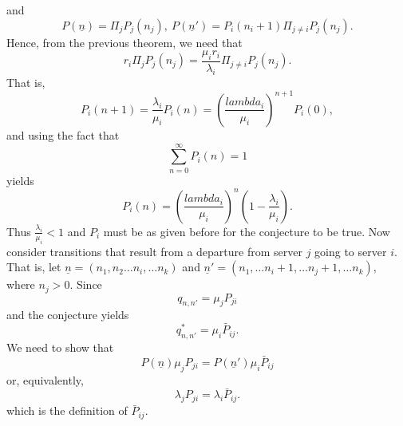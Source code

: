 \documentclass[a4paper,10pt]{article}
\theoremstyle{plain}
\theoremstyle{definition}
\theoremstyle{remark}
\begin{document}
 and 
 \begin{equation*}
 P(\underline{n})=\Pi_j P_j(n_j),~ P(\underline{n}')=P_i(n_i+1)\Pi_{j \neq i}P_j(n_j).
 \end{equation*}
 Hence, from the previous theorem, we need that
 \begin{equation*}
  r_i \Pi_j P_j(n_j)= \frac{\mu_i r_i}{\lambda_i}\Pi_{j \neq i}P_j(n_j).
 \end{equation*} 
 That is,
 \begin{equation*}
 P_i(n+1)= \frac{\lambda_i}{\mu_i}P_i(n)={(\frac{lambda_i}{\mu_i})}^{n+1}P_i(0),
 \end{equation*}
 and using the fact that 
 \begin{equation*}
\sum_{n=0}^{\infty}P_i(n)=1
 \end{equation*}
 yields 
 \begin{equation*}
P_i(n) ={(\frac{lambda_i}{\mu_i})}^n(1-\frac{\lambda_i}{\mu_i}).
\end{equation*}
Thus $\frac{\lambda_i}{\mu_i}< 1$ and $P_i$ must be as given before for the conjecture to be true. Now consider transitions that result from a departure from server $j$ going to server $i$. That is, let $\underline{n}=(n_1,n_2 \hdots n_i, \hdots n_k)$ and $\underline{n}'=(n_1,\hdots n_i+1,\hdots n_j+1,\hdots n_k)$, where $n_j >0$. Since
\begin{equation*}
q_{n,n'}=\mu_j P_{ji}
\end{equation*}
and the conjecture yields
\begin{equation*}
q_{n,n'}^*=\mu_i \bar{P}_{ij}.
\end{equation*}
We need to show that 
\begin{equation*}
P(\underline{n})\mu_j P_{ji}= P(\underline{n}')\mu_i \bar{P}_{ij}
\end{equation*}
or, equivalently,
\begin{equation*}
\lambda_j P_{ji}=\lambda_i \bar{P}_{ij}.
\end{equation*}
which is the definition of $\bar{P}_{ij}$.
\end{document}
